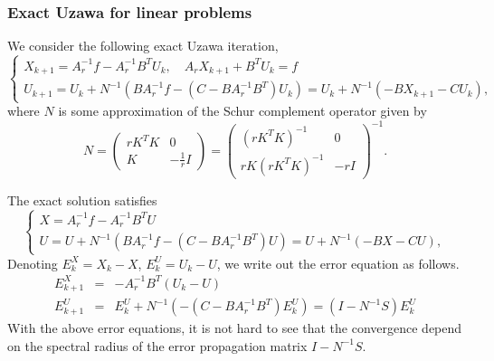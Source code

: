 \begin{itemize}
\subsubsection{Exact Uzawa for linear problems}
We consider the following exact Uzawa iteration,
\begin{equation}
    \begin{cases}
     X_{k+1} = A_r^{-1}f - A_r^{-1}B^T U_k, \quad A_r X_{k+1} +B^T U_k = f \\
     U_{k+1} = U_k + N^{-1} \left( B A_r^{-1} f - (C - B A_r^{-1}B^T)U_k \right) = U_k + N^{-1} \left( - B X_{k+1} - C U_k\right),
    \end{cases}
\end{equation}
where $N$ is some approximation of the Schur complement operator given by 
\begin{equation}
    N = \begin{pmatrix}
    r K^T K & 0\\
     K & - \frac{1}{r} I
    \end{pmatrix} = \begin{pmatrix}
     (r K^T K)^{-1} &  0 \\
    r K (r K^T K)^{-1} & -r I
    \end{pmatrix}^{-1}.
\end{equation}

The exact solution satisfies 
\begin{equation}
    \begin{cases}
     X = A_r^{-1}f - A_r^{-1}B^T U \\
     U = U + N^{-1} \left( B A_r^{-1} f - (C - B A_r^{-1}B^T)U \right) = U + N^{-1} \left( - B X - C U\right),
    \end{cases}
\end{equation}
Denoting $E^X_{k} = X_{k} - X$, $E^U_{k} = U_k - U$, we write out the error equation as follows.
\begin{eqnarray}
E^X_{k+1} &=& - A_r^{-1}B^T (U_k - U) \\
E^U_{k+1} &=& E^U_{k} + N^{-1} \left( -(C - B A_r^{-1}B^T) E^{U}_k \right) = (I - N^{-1}S) E^U_{k}
\end{eqnarray}
With the above error equations, it is not hard to see that the convergence depend on the spectral radius of the error propagation matrix $I - N^{-1}S$. 


\end{itemize}
